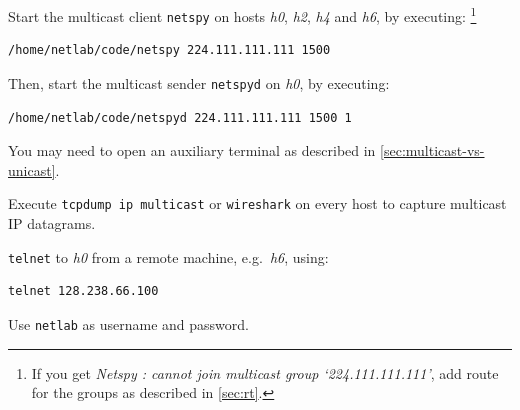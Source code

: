 \documentclass{../UTNetLab}
\begin{document}
    

    Start the multicast client \lstinline{netspy} on hosts \textit{h0}, \textit{h2}, \textit{h4} and \textit{h6}, by executing:%
    \footnote{If you get \textit{Netspy : cannot join multicast group `224.111.111.111'}, add route for the groups as described in \autoref{sec:rt}.}

    \begin{lstlisting}
/home/netlab/code/netspy 224.111.111.111 1500
    \end{lstlisting}
    
    Then, start the multicast sender \lstinline{netspyd} on \textit{h0}, by executing:

    \begin{lstlisting}
/home/netlab/code/netspyd 224.111.111.111 1500 1
    \end{lstlisting}
    You may need to open an auxiliary terminal as described in \autoref{sec:multicast-vs-unicast}.
    
    Execute \lstinline{tcpdump ip multicast} or \lstinline{wireshark} on every host to capture multicast IP datagrams.


    \lstinline{telnet} to \textit{h0} from a remote machine, e.g.\ \textit{h6}, using:

    \begin{lstlisting}
telnet 128.238.66.100
    \end{lstlisting}
    Use \texttt{netlab} as username and password.
\end{document}

